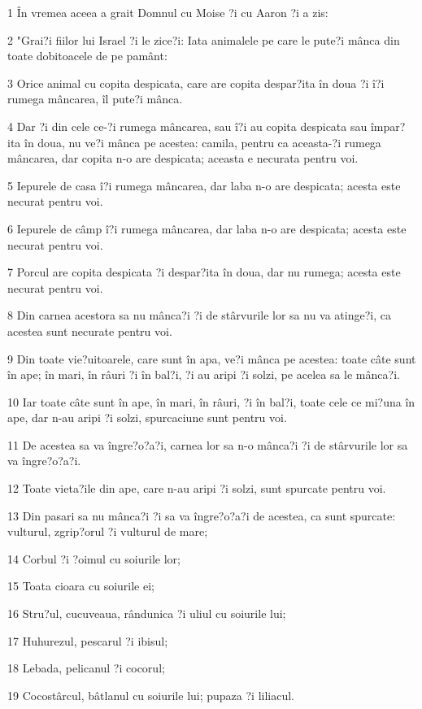 \par 1 În vremea aceea a grait Domnul cu Moise ?i cu Aaron ?i a zis:
\par 2 "Grai?i fiilor lui Israel ?i le zice?i: Iata animalele pe care le pute?i mânca din toate dobitoacele de pe pamânt:
\par 3 Orice animal cu copita despicata, care are copita despar?ita în doua ?i î?i rumega mâncarea, îl pute?i mânca.
\par 4 Dar ?i din cele ce-?i rumega mâncarea, sau î?i au copita despicata sau împar?ita în doua, nu ve?i mânca pe acestea: camila, pentru ca aceasta-?i rumega mâncarea, dar copita n-o are despicata; aceasta e necurata pentru voi.
\par 5 Iepurele de casa î?i rumega mâncarea, dar laba n-o are despicata; acesta este necurat pentru voi.
\par 6 Iepurele de câmp î?i rumega mâncarea, dar laba n-o are despicata; acesta este necurat pentru voi.
\par 7 Porcul are copita despicata ?i despar?ita în doua, dar nu rumega; acesta este necurat pentru voi.
\par 8 Din carnea acestora sa nu mânca?i ?i de stârvurile lor sa nu va atinge?i, ca acestea sunt necurate pentru voi.
\par 9 Din toate vie?uitoarele, care sunt în apa, ve?i mânca pe acestea: toate câte sunt în ape; în mari, în râuri ?i în bal?i, ?i au aripi ?i solzi, pe acelea sa le mânca?i.
\par 10 Iar toate câte sunt în ape, în mari, în râuri, ?i în bal?i, toate cele ce mi?una în ape, dar n-au aripi ?i solzi, spurcaciune sunt pentru voi.
\par 11 De acestea sa va îngre?o?a?i, carnea lor sa n-o mânca?i ?i de stârvurile lor sa va îngre?o?a?i.
\par 12 Toate vieta?ile din ape, care n-au aripi ?i solzi, sunt spurcate pentru voi.
\par 13 Din pasari sa nu mânca?i ?i sa va îngre?o?a?i de acestea, ca sunt spurcate: vulturul, zgrip?orul ?i vulturul de mare;
\par 14 Corbul ?i ?oimul cu soiurile lor;
\par 15 Toata cioara cu soiurile ei;
\par 16 Stru?ul, cucuveaua, rândunica ?i uliul cu soiurile lui;
\par 17 Huhurezul, pescarul ?i ibisul;
\par 18 Lebada, pelicanul ?i cocorul;
\par 19 Cocostârcul, bâtlanul cu soiurile lui; pupaza ?i liliacul.
